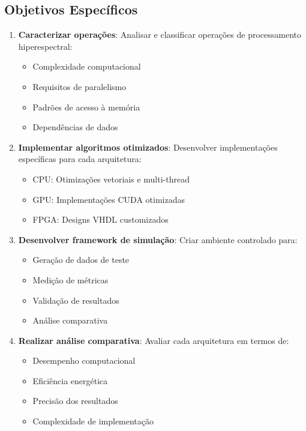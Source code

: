 \subsection{Objetivos Específicos}
\begin{enumerate}
    \item \textbf{Caracterizar operações}: Analisar e classificar operações de processamento hiperespectral:
    \begin{itemize}
        \item Complexidade computacional
        \item Requisitos de paralelismo
        \item Padrões de acesso à memória
        \item Dependências de dados
    \end{itemize}
    
    \item \textbf{Implementar algoritmos otimizados}: Desenvolver implementações específicas para cada arquitetura:
    \begin{itemize}
        \item CPU: Otimizações vetoriais e multi-thread
        \item GPU: Implementações CUDA otimizadas
        \item FPGA: Designs VHDL customizados
    \end{itemize}
    
    \item \textbf{Desenvolver framework de simulação}: Criar ambiente controlado para:
    \begin{itemize}
        \item Geração de dados de teste
        \item Medição de métricas
        \item Validação de resultados
        \item Análise comparativa
    \end{itemize}
    
    \item \textbf{Realizar análise comparativa}: Avaliar cada arquitetura em termos de:
    \begin{itemize}
        \item Desempenho computacional
        \item Eficiência energética
        \item Precisão dos resultados
        \item Complexidade de implementação
    \end{itemize}
    

\end{enumerate}
